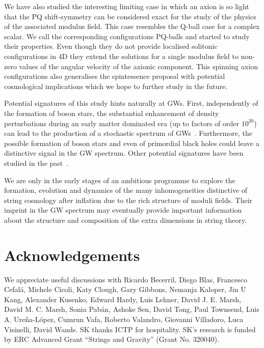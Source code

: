 \documentclass[11pt,a4paper]{article}
\begin{document}
We have also studied the interesting limiting case in which an axion is so light that the PQ shift-symmetry can be considered exact for the study of the physics of the associated modulus field.
This case resembles the Q-ball case for a complex scalar. We call the corresponding configurations PQ-balls and started to study their properties. Even though they do not provide localised solitonic configurations in 4D they extend the solutions for a single modulus field to non-zero values of the angular velocity of the axionic component. This spinning axion configurations also generalises the spintessence proposal with potential cosmological implications which we hope to further study in the future.

Potential signatures of this study hints naturally at GWs. First, independently of the formation of boson stars, the substantial enhancement of density perturbations during an early matter dominated era (up to factors of order $10^{20}$) can lead to the production of a stochastic spectrum of GWs~\cite{Assadullahi:2009nf}. Furthermore, the possible formation of boson stars and even of primordial black holes could leave a distinctive signal in the GW spectrum. Other potential signatures have been studied in the past~\cite{0801.0307}.

We are only in the early stages of an ambitious programme to explore the formation, evolution and dynamics of the many inhomogeneities distinctive of string cosmology after inflation due to the rich structure of moduli fields. Their imprint in the GW spectrum may eventually provide important information about the structure and composition of the extra dimensions in string theory.


\section*{Acknowledgements}
We appreciate useful discussions with Ricardo Becerril, Diego Blas, Francesco Cefal\'a, Michele Cicoli, Katy Clough, Gary Gibbons, Nemanja Kaloper, Jin U Kang, Alexander Kusenko, Edward Hardy, Luis Lehner, David J. E. Marsh, David M. C. Marsh, Sonia Pab\'an, Ashoke Sen, David Tong, Paul Townsend, Luis A. Ure\~na-L\'opez, Cumrun Vafa, Roberto Valandro, Giovanni Villadoro, Luca Visinelli, David Wands. SK thanks ICTP for hospitality. SK's research is funded by ERC Advanced Grant ``Strings and Gravity'' (Grant No. 320040).



\end{document}
